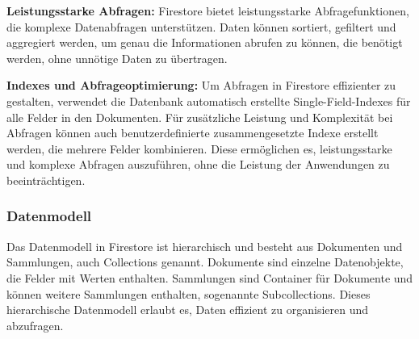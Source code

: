 \textbf{Leistungsstarke Abfragen:} Firestore bietet leistungsstarke Abfragefunktionen, die komplexe Datenabfragen unterstützen.
Daten können sortiert, gefiltert und aggregiert werden, um
genau die Informationen abrufen zu können, die benötigt
werden, ohne unnötige Daten zu übertragen.

\textbf{Indexes und Abfrageoptimierung:} Um Abfragen in Firestore effizienter zu gestalten, verwendet die Datenbank automatisch erstellte Single-Field-Indexes für alle Felder in den Dokumenten. Für zusätzliche Leistung und Komplexität bei Abfragen können auch benutzerdefinierte zusammengesetzte Indexe erstellt werden, die mehrere Felder kombinieren. Diese ermöglichen es, leistungsstarke und komplexe Abfragen auszuführen, ohne die Leistung der Anwendungen zu beeinträchtigen.


\subsubsection{Datenmodell}

Das Datenmodell\cite{firestore_datamodel} in Firestore ist hierarchisch und besteht aus Dokumenten und Sammlungen, auch Collections genannt. Dokumente sind einzelne Datenobjekte, die Felder mit Werten enthalten. Sammlungen sind Container für Dokumente und können weitere Sammlungen enthalten, sogenannte Subcollections. Dieses hierarchische Datenmodell erlaubt es, Daten effizient zu organisieren und abzufragen.




